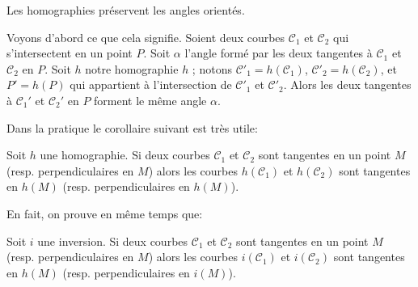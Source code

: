 \documentclass[11pt,class=report,crop=false]{standalone}
\newcommand{\inversion}{i}
\begin{document}
\begin{theoreme}
\label{th:angle}
Les homographies préservent les angles orientés. 
\end{theoreme}

Voyons d'abord ce que cela signifie. Soient deux courbes $\mathcal{C}_1$ et $\mathcal{C}_2$
qui s'intersectent en un point $P$. Soit $\alpha$ l'angle formé par les deux tangentes à $\mathcal{C}_1$ et $\mathcal{C}_2$ en $P$.
Soit $h$ notre homographie $h$ ; notons $\mathcal{C}'_1 = h(\mathcal{C}_1)$,
$\mathcal{C}'_2 = h(\mathcal{C}_2)$, et $P' = h(P)$ qui appartient à l'intersection
de $\mathcal{C}'_1$ et $\mathcal{C}'_2$. Alors les deux tangentes à $\mathcal{C}_1'$ et $\mathcal{C}_2'$ en $P$
forment le même angle $\alpha$.

Dans la pratique le corollaire suivant est très utile:
\begin{corollaire}
Soit $h$ une homographie. Si deux courbes $\mathcal{C}_1$ et $\mathcal{C}_2$ sont tangentes
en un point $M$ (resp. perpendiculaires en $M$) alors les courbes
$h(\mathcal{C}_1)$ et $h(\mathcal{C}_2)$ sont tangentes en $h(M)$
(resp. perpendiculaires en $h(M)$).
\end{corollaire}

En fait, on prouve en même temps que:
\begin{corollaire}
Soit $\inversion$ une inversion. Si deux courbes $\mathcal{C}_1$ et $\mathcal{C}_2$ sont tangentes
en un point $M$ (resp. perpendiculaires en $M$) alors les courbes
$\inversion(\mathcal{C}_1)$ et $\inversion(\mathcal{C}_2)$ sont tangentes en $h(M)$
(resp. perpendiculaires en $\inversion(M)$).
\end{corollaire}
\end{document}
